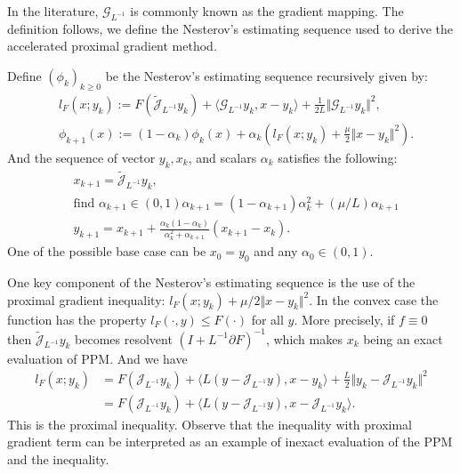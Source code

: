 \documentclass[12pt]{article}
\begin{document}
    In the literature, $\mathcal G_{L^{-1}}$ is commonly known as the gradient mapping. 
    The definition follows, we define the Nesterov's estimating sequence used to derive the accelerated proximal gradient method. 
    \begin{definition}\label{def:nes-est-seq-pg}
        Define $(\phi_k)_{k \ge0}$ be the Nesterov's estimating sequence recursively given by: 
        \begin{align*}
            & l_F(x; y_k) := 
                F\left(\widetilde{\mathcal J}_{L^{-1}} y_k \right) 
                + \langle \mathcal G_{L^{-1}}y_k, x - y_k\rangle + 
            \frac{1}{2L}\Vert \mathcal G_{L^{-1}}y_k\Vert^2, 
            \\
            & 
            \phi_{k + 1}(x)
            := (1 - \alpha_k)\phi_k (x) + 
            \alpha_k 
            \left(
                l_F(x; y_k) + \frac{\mu}{2}\Vert x - y_k\Vert^2
            \right). 
        \end{align*}
        And the sequence of vector $y_k, x_k$, and scalars $\alpha_k$ satisfies the following: 
        \begin{align*}
            &x_{k + 1} = \widetilde{\mathcal J}_{L^{-1}} y_k, 
            \\
            & \text{find } \alpha_{k + 1} \in (0, 1)
            \alpha_{k + 1} = (1 - \alpha_{k + 1})\alpha_k^{2} + (\mu/L) \alpha_{k + 1}
            \\
            &y_{k + 1} = x_{k + 1} + \frac{\alpha_k(1 - \alpha_k)}{\alpha_k^2 + \alpha_{k + 1}}(x_{k + 1} - x_k). 
        \end{align*}
        One of the possible base case can be $x_0 = y_0$ and any $\alpha_0 \in (0, 1)$. 
    \end{definition}
    \begin{observation}
        One key component of the Nesterov's estimating sequence is the use of the proximal gradient inequality: $l_F(x; y_k) + \mu/2\Vert x - y_k\Vert^2$. 
        In the convex case the function has the property $l_F(\cdot, y) \le F(\cdot)$ for all $y$. 
        More precisely, if $f \equiv 0$ then $\widetilde{\mathcal J}_{L^{-1}}y_k$ becomes resolvent $(I + L^{-1}\partial F)^{-1}$, which makes $x_k$ being an exact evaluation of PPM.
        And we have 
        \begin{align*}
            l_F(x; y_k) 
            &= F(\mathcal J_{L^{-1}}y_k) 
            + \langle L(y - \mathcal J_{L^{-1}} y), x - y_k\rangle + \frac{L}{2}\Vert y_k - \mathcal J_{L^{-1}}y_k\Vert^2
            \\
            &= F(\mathcal J_{L^{-1}}y_k) 
            + \langle L(y - \mathcal J_{L^{-1}} y), x - \mathcal J_{L^{-1}}y_k\rangle. 
        \end{align*}
        This is the proximal inequality. 
        Observe that the inequality with proximal gradient term can be interpreted as an example of inexact evaluation of the PPM and the inequality. 
    \end{observation}
\end{document}
